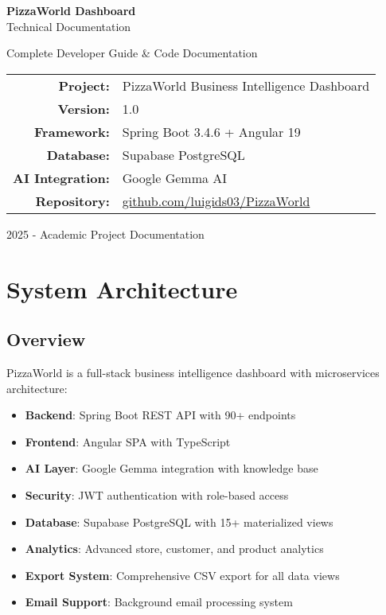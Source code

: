 \documentclass[11pt,a4paper]{article}
\begin{document}
\begin{titlepage}
    \centering
    \vspace*{2cm}
    
    {\Huge\bfseries PizzaWorld Dashboard}\\[0.5cm]
    {\Large Technical Documentation}
    
    \vspace{2cm}
    
    {\large Complete Developer Guide \& Code Documentation}
    
    \vspace{3cm}
    
    \begin{tabular}{rl}
        \textbf{Project:} & PizzaWorld Business Intelligence Dashboard \\[0.2cm]
        \textbf{Version:} & 1.0 \\[0.2cm]
        \textbf{Framework:} & Spring Boot 3.4.6 + Angular 19 \\[0.2cm]
        \textbf{Database:} & Supabase PostgreSQL \\[0.2cm]
        \textbf{AI Integration:} & Google Gemma AI \\[0.2cm]
        \textbf{Repository:} & \href{https://github.com/luigids03/PizzaWorld}{github.com/luigids03/PizzaWorld}
    \end{tabular}
    
    \vfill
    
    {\large \textcopyright{} 2025 - Academic Project Documentation}
\end{titlepage}

\tableofcontents
\newpage

\section{System Architecture}

\subsection{Overview}
PizzaWorld is a full-stack business intelligence dashboard with microservices architecture:

\begin{itemize}[leftmargin=*]
    \item \textbf{Backend}: Spring Boot REST API with 90+ endpoints
    \item \textbf{Frontend}: Angular SPA with TypeScript
    \item \textbf{AI Layer}: Google Gemma integration with knowledge base
    \item \textbf{Security}: JWT authentication with role-based access
    \item \textbf{Database}: Supabase PostgreSQL with 15+ materialized views
    \item \textbf{Analytics}: Advanced store, customer, and product analytics
    \item \textbf{Export System}: Comprehensive CSV export for all data views
    \item \textbf{Email Support}: Background email processing system
\end{itemize}
\end{document}
